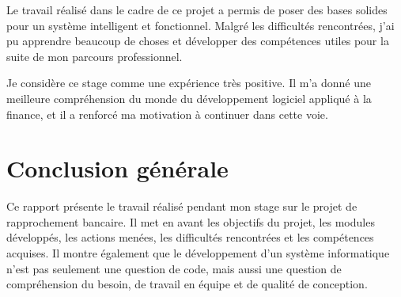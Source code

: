 ﻿\documentclass[12pt,a4paper]{report}
\begin{document}
Le travail réalisé dans le cadre de ce projet a permis de poser des bases solides pour un système intelligent et fonctionnel. Malgré les difficultés rencontrées, j'ai pu apprendre beaucoup de choses et développer des compétences utiles pour la suite de mon parcours professionnel.

Je considère ce stage comme une expérience très positive. Il m'a donné une meilleure compréhension du monde du développement logiciel appliqué à la finance, et il a renforcé ma motivation à continuer dans cette voie.

\chapter*{Conclusion générale}
Ce rapport présente le travail réalisé pendant mon stage sur le projet de rapprochement bancaire. Il met en avant les objectifs du projet, les modules développés, les actions menées, les difficultés rencontrées et les compétences acquises. Il montre également que le développement d'un système informatique n'est pas seulement une question de code, mais aussi une question de compréhension du besoin, de travail en équipe et de qualité de conception.
\end{document}
